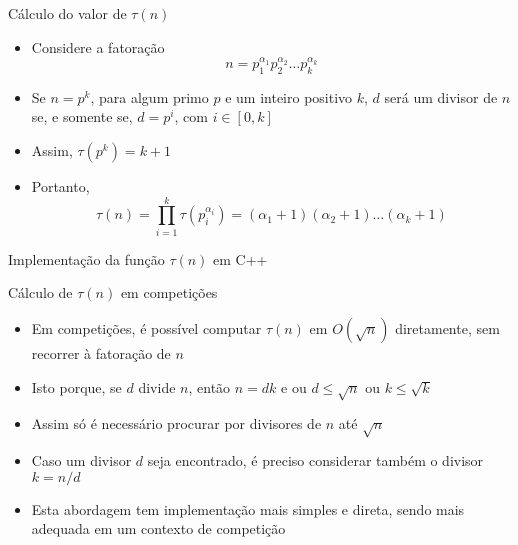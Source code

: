 \begin{frame}[fragile]{Cálculo do valor de $\tau(n)$}

    \begin{itemize}
        \item  Considere a fatoração
$$
    n = p_1^{\alpha_1}p_2^{\alpha_2}\ldots p_k^{\alpha_k}
$$

        \item Se $n = p^k$, para algum primo $p$ e um inteiro positivo $k$, $d$ será um divisor de $n$ se, e somente se, $d = p^i$, com $i\in [0, k]$

        \item Assim, $\tau(p^k) = k + 1$

        \item  Portanto,
$$
    \tau(n) = \prod_{i = 1}^k \tau(p_i^{\alpha_i}) = (\alpha_1 + 1)(\alpha_2 + 1)\ldots (\alpha_k + 1)
$$
    \end{itemize}

\end{frame}

\begin{frame}[fragile]{Implementação da função $\tau(n)$ em C++}
\end{frame}

\begin{frame}[fragile]{Cálculo de $\tau(n)$ em competições}

    \begin{itemize}
        \item Em competições, é possível computar $\tau(n)$ em $O(\sqrt{n})$ diretamente, sem recorrer à fatoração de $n$

        \item Isto porque, se $d$ divide $n$, então $n = dk$ e ou $d\leq \sqrt{n}$ ou $k \leq \sqrt{k}$

        \item Assim só é necessário procurar por divisores de $n$ até $\sqrt{n}$

        \item Caso um divisor $d$ seja encontrado, é preciso considerar também o divisor $k = n/d$

        \item Esta abordagem tem implementação mais simples e direta, sendo mais adequada em um contexto de competição
    \end{itemize}

\end{frame}

